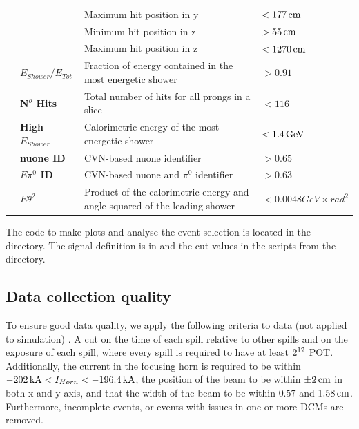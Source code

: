 \begin{table}[!hb]
\begin{tabular}{|m{2mm} m{} m{} m{}|}
& & Maximum hit position in y & $<\unit[177]{cm}$\\
& & Minimum hit position in z & $>\unit[55]{cm}$\\
& & Maximum hit position in z & $<\unit[1270]{cm}$\\\hline
\parbox[t]{2mm}{} &
\textbf{$E_{Shower}/E_{Tot}$} & Fraction of energy contained in the most energetic shower & $>0.91$\\
& \textbf{N$^o$ Hits} & Total number of hits for all prongs in a slice & $<116$\\
& \textbf{High $E_{Shower}$} & Calorimetric energy of the most energetic shower & $<\unit[1.4]{GeV}$\\
& \textbf{\gls{nuone} ID} & \gls{CVN}-based \gls{nuone} identifier & $>0.65$\\
& \textbf{$E\pi^0$ ID} & \gls{CVN}-based \gls{nuone} and $\pi^0$ identifier & $>0.63$\\
& \textbf{$E\theta^2$} & Product of the calorimetric energy and angle squared of the leading shower & $<0.0048\unit{GeV\times rad^2}$\\\hline
\end{tabular}
\label{tab:EventSelectionSummary}
\end{table}

The code to make plots and analyse the event selection is located in the  directory. The signal definition is in  and the cut values in the  scripts from the  directory.

\subsection{Data collection quality}\label{sec:NuMMEventSelSpillCuts}
To ensure good data quality, we apply the following criteria to data (not applied to simulation) \cite{NOvA-doc-59876}. A cut on the time of each spill relative to other spills and on the exposure of each spill, where every spill is required to have at least $2\time10^{12}$ \gls{POT}. Additionally, the current in the focusing horn is required to be within $\unit[-202]{kA}<I_{Horn}<\unit[-196.4]{kA}$, the position of the beam to be within $\pm\unit[2]{cm}$ in both x and y axis, and that the width of the beam to be within $0.57$ and $\unit[1.58]{cm}$. Furthermore, incomplete events, or events with issues in one or more \glspl{DCM} are removed.

